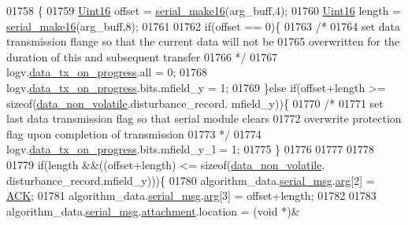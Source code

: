 \begin{DoxyCode}
{{{{{01758                 \{
01759                     \hyperlink{a00072_a59a9f6be4562c327cbfb4f7e8e18f08b}{Uint16} offset = \hyperlink{a00031_abc17de32f14103a5be219df0d4ad9176}{serial\_make16}(arg\_buff,4);
01760                     \hyperlink{a00072_a59a9f6be4562c327cbfb4f7e8e18f08b}{Uint16} length = \hyperlink{a00031_abc17de32f14103a5be219df0d4ad9176}{serial\_make16}(arg\_buff,8);
01761 
01762                     \textcolor{keywordflow}{if}(offset == 0)\{
01763                          \textcolor{comment}{/*}
01764 \textcolor{comment}{                         set data transmission flange so that the current data will not be}
01765 \textcolor{comment}{                         overwritten for the duration of this and subsequent transfer}
01766 \textcolor{comment}{                       */}
01767                         logv.\hyperlink{a00021_a6cdefde69642ef511e3252c38be68516}{data\_tx\_on\_progress}.all       = 0;
01768                         logv.\hyperlink{a00021_a6cdefde69642ef511e3252c38be68516}{data\_tx\_on\_progress}.bits.mfield\_y   = 1;
01769                     \}\textcolor{keywordflow}{else} \textcolor{keywordflow}{if}(offset+length >= \textcolor{keyword}{sizeof}(\hyperlink{a00060_a76ac5f917f5308dcd83de0d7c94559fb}{data\_non\_volatile}.disturbance\_record.
      mfield\_y))\{
01770                         \textcolor{comment}{/*}
01771 \textcolor{comment}{                         set last data transmission flag so that serial module clears}
01772 \textcolor{comment}{                         overwrite protection flag upon completion of transmission}
01773 \textcolor{comment}{                       */}
01774                         logv.\hyperlink{a00021_a6cdefde69642ef511e3252c38be68516}{data\_tx\_on\_progress}.bits.mfield\_y\_l = 1;
01775                     \}
01776 
01777 
01778 
01779                    \textcolor{keywordflow}{if}(length &&((offset+length) <= \textcolor{keyword}{sizeof}(\hyperlink{a00060_a76ac5f917f5308dcd83de0d7c94559fb}{data\_non\_volatile}.
      disturbance\_record.mfield\_y)))\{
01780                        algorithm\_data.\hyperlink{a00016_afcf5f557aea688aad985eec15269c1da}{serial\_msg}.\hyperlink{a00031_af7d6f762438c80072bd9dc0e4dd4ae1e}{arg}[2]                 = 
      \hyperlink{a00021_a6f6489887e08bff4887d0bc5dcf214d8}{ACK};
01781                        algorithm\_data.\hyperlink{a00016_afcf5f557aea688aad985eec15269c1da}{serial\_msg}.\hyperlink{a00031_af7d6f762438c80072bd9dc0e4dd4ae1e}{arg}[3]                 = offset+length;
01782 
01783                        algorithm\_data.\hyperlink{a00016_afcf5f557aea688aad985eec15269c1da}{serial\_msg}.\hyperlink{a00031_a040f6d5d58d18d8aeaf447eda7f50172}{attachment}.location    = (\textcolor{keywordtype}{void} *)&
}}}}}
\end{DoxyCode}
